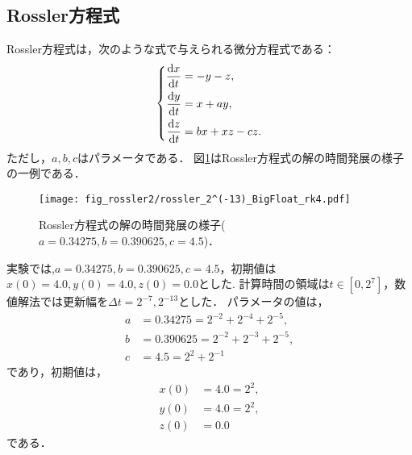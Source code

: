\subsection{Rossler方程式}
Rossler方程式は，次のような式で与えられる微分方程式である：
\begin{align*}
    \left\{
    \begin{aligned}        
        \frac{\mathrm{d}x}{\mathrm{d}t} &= -y-z, \\
        \frac{\mathrm{d}y}{\mathrm{d}t} &= x+ay, \\
        \frac{\mathrm{d}z}{\mathrm{d}t} &= bx + xz - cz.
    \end{aligned}
    \right.
\end{align*}
ただし，$a,b,c$はパラメータである．
図\ref{fig:rossler}はRossler方程式の解の時間発展の様子の一例である．
\begin{figure}[H]
    \centering
    \texttt{[image: fig\_rossler2/rossler\_2^(-13)\_BigFloat\_rk4.pdf]}
    \caption{Rossler方程式の解の時間発展の様子($a=0.34275, b=0.390625, c=4.5$)．}
    \label{fig:rossler}
\end{figure}
実験では,$a=0.34275, b=0.390625, c=4.5$，初期値は$x(0) = 4.0, y(0) = 4.0, z(0) = 0.0$とした.
計算時間の領域は$t \in [0, 2^7]$，数値解法では更新幅を$\Delta t =   2^{-7},2^{-13}$とした．
パラメータの値は，
\begin{align*}
    a &= 0.34275 = 2^{-2} + 2^{-4} + 2^{-5},\\
    b &= 0.390625 = 2^{-2} + 2^{-3} + 2^{-5},\\ 
    c &= 4.5 = 2^2 + 2^{-1}
\end{align*}
であり，初期値は，
\begin{align*}
    x(0) &= 4.0 = 2^2,\\
    y(0) &= 4.0 = 2^2 ,\\
    z(0) &= 0.0 
\end{align*}
である．
